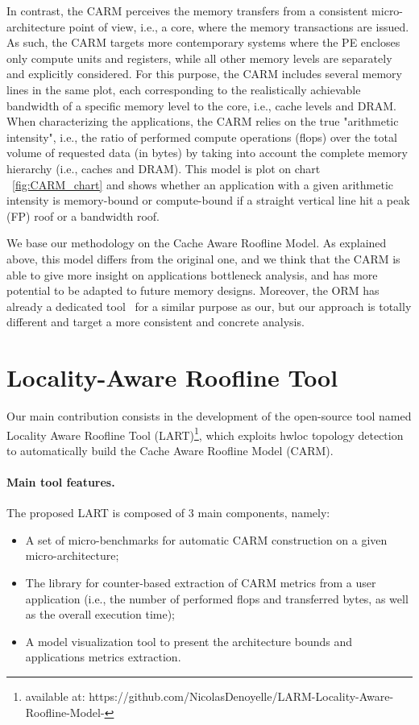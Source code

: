 \documentclass[twoside,twocolumn,8pt]{extarticle}
\begin{document}
In contrast, the CARM perceives the memory transfers from a consistent micro-architecture point of view, i.e., a core, where
the memory transactions are issued. As such, the CARM targets more contemporary systems where the PE encloses only compute units
and registers, while all other memory levels are separately and explicitly considered. For this purpose, the CARM includes several
memory lines in the same plot, each corresponding to the realistically achievable bandwidth of a specific memory level to the core,
i.e., cache levels and DRAM. When characterizing the applications, the CARM relies on the true "arithmetic intensity", i.e., the
ratio of performed compute operations (flops) over the total volume of requested data (in bytes) by taking into account the
complete memory hierarchy (i.e., caches and DRAM). This model is plot on chart ~\ref{fig:CARM_chart} and shows whether an
application with a given arithmetic intensity is memory-bound or compute-bound if a straight vertical line hit a peak (FP) roof
or a bandwidth roof.

We base our methodology on the Cache Aware Roofline Model. 
As explained above, this model differs from the original one, and we think that the CARM is able to give more insight on
applications bottleneck analysis, and has more potential to be adapted to future memory designs. Moreover, the ORM has already a
dedicated tool~\cite{Lo2015} for a similar purpose as our, but our approach is totally different and target a more consistent and
concrete analysis.

\section{Locality-Aware Roofline Tool}\label{sec:contrib}

Our main contribution consists in the development of the open-source tool named Locality Aware Roofline Tool (LART)\footnote{available at: https://github.com/NicolasDenoyelle/LARM-Locality-Aware-Roofline-Model-}, which
exploits hwloc topology detection to automatically build the Cache Aware Roofline Model (CARM).

\paragraph*{Main tool features.}

The proposed LART is composed of 3 main components, namely:
\begin{itemize}
\item A set of micro-benchmarks for automatic CARM construction on a given micro-architecture;
\item The library for counter-based extraction  of CARM metrics from a user application (i.e., the number of performed flops and
  transferred bytes, as well as the overall execution time);
\item A model visualization tool to present the architecture bounds and applications metrics extraction.
\end{itemize}
\end{document}
